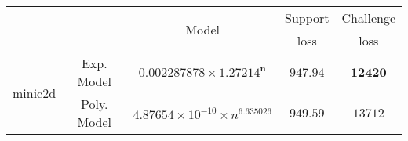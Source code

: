 \begin{tabular}{ccccc} 
\hline 
 &  & \multirow{2}{*}{Model} & Support & Challenge\tabularnewline 
 &  &  & loss  & loss\tabularnewline 
\hline 
\hline 
\multirow{2}{*}{minic2d} & Exp. Model & $\mathbf{0.002287878\times 1.27214^{n}}$ & $\mathbf{947.94}$ & $\mathbf{12420}$ \tabularnewline 
 & Poly. Model & $4.87654\times10^{-10}\times n^{6.635026}$ & $949.59$ & $13712$ \tabularnewline 
\hline 
\end{tabular} 

